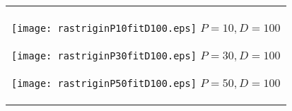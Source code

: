 \documentclass[a4paper,11pt,oneside,openany]{jsbook}
\begin{document}
\begin{figure}[htbp]
  \begin{center}
    \begin{tabular}{c}

      \begin{minipage}{0.33\hsize}
        \begin{center}
          \texttt{[image: rastriginP10fitD100.eps]}
          \hspace{1.2cm} $P=10, D=100$
        \end{center}
      \end{minipage}

      \begin{minipage}{0.33\hsize}
        \begin{center}
          \texttt{[image: rastriginP30fitD100.eps]}
          \hspace{1.2cm} $P=30, D=100$
        \end{center}
      \end{minipage}

      \begin{minipage}{0.33\hsize}
        \begin{center}
          \texttt{[image: rastriginP50fitD100.eps]}
          \hspace{1.2cm} $P=50, D=100$
        \end{center}
      \end{minipage}
    \end{tabular}
    \label{fig:lena}
  \end{center}
\end{figure}
\end{document}
